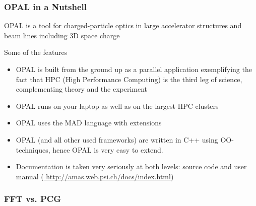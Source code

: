 \documentclass[xcolor=pdftex,table,10pt]{beamer}
\newcommand{\opal}{\textsc{OPAL }}
\begin{document}
    \begin{frame}
        \frametitle{\opal in a Nutshell}

        \begin{alertblock}{}  
         \opal is a tool for charged-particle optics in large
         accelerator structures and beam lines including 3D space charge
        \end{alertblock}

        \vspace{0.2cm}

        \begin{block}{Some of the features}  
         \begin{itemize}
         \item \opal is built from the ground up as a parallel application exemplifying the fact that HPC (High Performance Computing) 
         is the third leg of science, complementing theory and the experiment
         \item  \opal runs on your laptop as well as on the largest HPC clusters
         \item \opal uses the \textsc{MAD} language with extensions
         \item \opal (and all other used frameworks) are written in C++ using OO-techniques, hence \opal is very easy to extend.
         \item Documentation is taken very seriously at both levels: source code and user manual (\url{ http://amas.web.psi.ch/docs/index.html})
         \end{itemize}
        \end{block}

    \end{frame}
    
    \begin{frame}
        \frametitle{FFT vs. PCG}

        \begin{minipage}[b]{0.45\textwidth}
        \centering
        

        \end{minipage}
        \begin{minipage}[b]{0.45\textwidth}
        \centering
        

        \end{minipage} 

    \end{frame}
\end{document}
